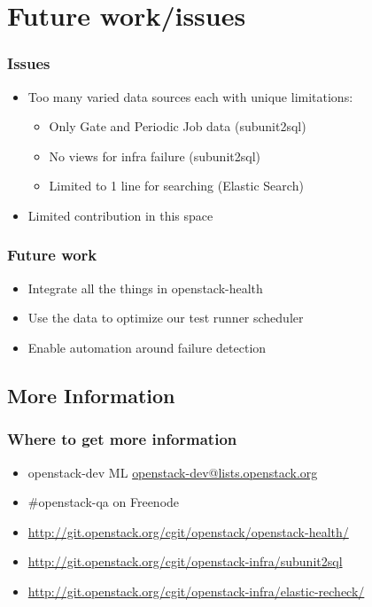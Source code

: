 \documentclass[aspectratio=43,11pt,hyperref={colorlinks=true}]{beamer}
\begin{document}
\section{Future work/issues}

\begin{frame}
    \frametitle{Issues}
    \begin{itemize}
        \item Too many varied data sources each with unique limitations:
        \begin{itemize}
            \item Only Gate and Periodic Job data (subunit2sql)
            \item No views for infra failure (subunit2sql)
            \item Limited to 1 line for searching (Elastic Search)
        \end{itemize}
        \item Limited contribution in this space
    \end{itemize}
\end{frame}

\begin{frame}
    \frametitle{Future work}
    \begin{itemize}
        \item Integrate all the things in openstack-health
        \item Use the data to optimize our test runner scheduler
        \item Enable automation around failure detection
    \end{itemize}
\end{frame}

\subsection{More Information}
\begin{frame}
\frametitle{Where to get more information}
    \begin{itemize}
        \item openstack-dev ML\: \href{mailto:openstack-dev@lists.openstack.org}{openstack-dev@lists.openstack.org}
        \item \#openstack-qa on Freenode
        \item \href{http://git.openstack.org/cgit/openstack/openstack-health/}{http://git.openstack.org/cgit/openstack/openstack-health/}
        \item \href{http://git.openstack.org/cgit/openstack-infra/subunit2sql}{http://git.openstack.org/cgit/openstack-infra/subunit2sql}
        \item \href{http://git.openstack.org/cgit/openstack-infra/elastic-recheck/}{http://git.openstack.org/cgit/openstack-infra/elastic-recheck/}
    \end{itemize}
\end{frame}
\end{document}
